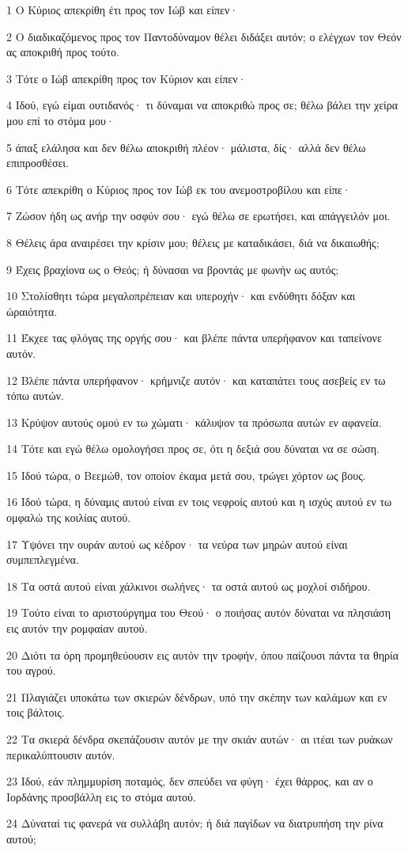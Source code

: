 \par 1 Ο Κύριος απεκρίθη έτι προς τον Ιώβ και είπεν·
\par 2 Ο διαδικαζόμενος προς τον Παντοδύναμον θέλει διδάξει αυτόν; ο ελέγχων τον Θεόν ας αποκριθή προς τούτο.
\par 3 Τότε ο Ιώβ απεκρίθη προς τον Κύριον και είπεν·
\par 4 Ιδού, εγώ είμαι ουτιδανός· τι δύναμαι να αποκριθώ προς σε; θέλω βάλει την χείρα μου επί το στόμα μου·
\par 5 άπαξ ελάλησα και δεν θέλω αποκριθή πλέον· μάλιστα, δίς· αλλά δεν θέλω επιπροσθέσει.
\par 6 Τότε απεκρίθη ο Κύριος προς τον Ιώβ εκ του ανεμοστροβίλου και είπε·
\par 7 Ζώσον ήδη ως ανήρ την οσφύν σου· εγώ θέλω σε ερωτήσει, και απάγγειλόν μοι.
\par 8 Θέλεις άρα αναιρέσει την κρίσιν μου; θέλεις με καταδικάσει, διά να δικαιωθής;
\par 9 Έχεις βραχίονα ως ο Θεός; ή δύνασαι να βροντάς με φωνήν ως αυτός;
\par 10 Στολίσθητι τώρα μεγαλοπρέπειαν και υπεροχήν· και ενδύθητι δόξαν και ώραιότητα.
\par 11 Έκχεε τας φλόγας της οργής σου· και βλέπε πάντα υπερήφανον και ταπείνονε αυτόν.
\par 12 Βλέπε πάντα υπερήφανον· κρήμνιζε αυτόν· και καταπάτει τους ασεβείς εν τω τόπω αυτών.
\par 13 Κρύψον αυτούς ομού εν τω χώματι· κάλυψον τα πρόσωπα αυτών εν αφανεία.
\par 14 Τότε και εγώ θέλω ομολογήσει προς σε, ότι η δεξιά σου δύναται να σε σώση.
\par 15 Ιδού τώρα, ο Βεεμώθ, τον οποίον έκαμα μετά σου, τρώγει χόρτον ως βους.
\par 16 Ιδού τώρα, η δύναμις αυτού είναι εν τοις νεφροίς αυτού και η ισχύς αυτού εν τω ομφαλώ της κοιλίας αυτού.
\par 17 Υψόνει την ουράν αυτού ως κέδρον· τα νεύρα των μηρών αυτού είναι συμπεπλεγμένα.
\par 18 Τα οστά αυτού είναι χάλκινοι σωλήνες· τα οστά αυτού ως μοχλοί σιδήρου.
\par 19 Τούτο είναι το αριστούργημα του Θεού· ο ποιήσας αυτόν δύναται να πλησιάση εις αυτόν την ρομφαίαν αυτού.
\par 20 Διότι τα όρη προμηθεύουσιν εις αυτόν την τροφήν, όπου παίζουσι πάντα τα θηρία του αγρού.
\par 21 Πλαγιάζει υποκάτω των σκιερών δένδρων, υπό την σκέπην των καλάμων και εν τοις βάλτοις.
\par 22 Τα σκιερά δένδρα σκεπάζουσιν αυτόν με την σκιάν αυτών· αι ιτέαι των ρυάκων περικαλύπτουσιν αυτόν.
\par 23 Ιδού, εάν πλημμυρίση ποταμός, δεν σπεύδει να φύγη· έχει θάρρος, και αν ο Ιορδάνης προσβάλλη εις το στόμα αυτού.
\par 24 Δύναταί τις φανερά να συλλάβη αυτόν; ή διά παγίδων να διατρυπήση την ρίνα αυτού;

